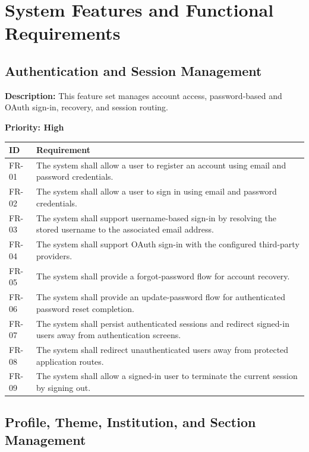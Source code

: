 \documentclass[12pt]{article}
\begin{document}
\section{System Features and Functional Requirements}

\subsection{Authentication and Session Management}

\textbf{Description:} This feature set manages account access, password-based and
OAuth sign-in, recovery, and session routing.

\textbf{Priority: High}

\begin{longtable}{|L{2.3cm}|L{11.3cm}|}
\hline
\textbf{ID} & \textbf{Requirement} \\
\hline
FR-01 & The system shall allow a user to register an account using email and password credentials. \\
\hline
FR-02 & The system shall allow a user to sign in using email and password credentials. \\
\hline
FR-03 & The system shall support username-based sign-in by resolving the stored username to the associated email address. \\
\hline
FR-04 & The system shall support OAuth sign-in with the configured third-party providers. \\
\hline
FR-05 & The system shall provide a forgot-password flow for account recovery. \\
\hline
FR-06 & The system shall provide an update-password flow for authenticated password reset completion. \\
\hline
FR-07 & The system shall persist authenticated sessions and redirect signed-in users away from authentication screens. \\
\hline
FR-08 & The system shall redirect unauthenticated users away from protected application routes. \\
\hline
FR-09 & The system shall allow a signed-in user to terminate the current session by signing out. \\
\hline
\end{longtable}

\subsection{Profile, Theme, Institution, and Section Management}
\end{document}
